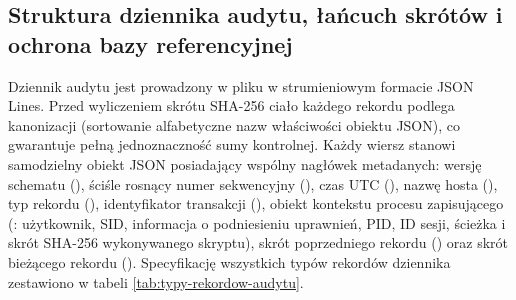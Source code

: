 \subsection{Struktura dziennika audytu, łańcuch skrótów i ochrona bazy referencyjnej}\label{subsec:struktura-pliku-audytu}

Dziennik audytu jest prowadzony w pliku  w strumieniowym formacie JSON Lines. Przed wyliczeniem skrótu SHA-256 ciało każdego rekordu podlega kanonizacji (sortowanie alfabetyczne nazw właściwości obiektu JSON), co gwarantuje pełną jednoznaczność sumy kontrolnej. Każdy wiersz stanowi samodzielny obiekt JSON posiadający wspólny nagłówek metadanych: wersję schematu (), ściśle rosnący numer sekwencyjny (), czas UTC (), nazwę hosta (), typ rekordu (), identyfikator transakcji (), obiekt kontekstu procesu zapisującego (: użytkownik, SID, informacja o podniesieniu uprawnień, PID, ID sesji, ścieżka i skrót SHA-256 wykonywanego skryptu), skrót poprzedniego rekordu () oraz skrót bieżącego rekordu (). Specyfikację wszystkich typów rekordów dziennika zestawiono w tabeli \ref{tab:typy-rekordow-audytu}.

